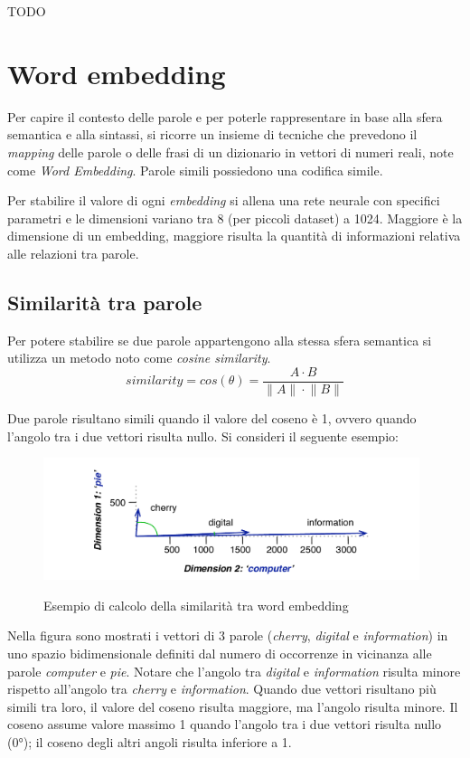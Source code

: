 TODO

\section{Word embedding}
Per capire il contesto delle parole e per poterle rappresentare in base alla sfera semantica e alla sintassi, si ricorre un insieme di tecniche che prevedono il \textit{mapping} delle parole o delle frasi di un dizionario in vettori di numeri reali, note come \emph{Word Embedding}.
Parole simili possiedono una codifica simile.


Per stabilire il valore di ogni \textit{embedding} si allena una rete neurale con specifici parametri e le dimensioni variano tra 8 (per piccoli dataset) a 1024. Maggiore è la dimensione di un embedding, maggiore risulta la quantità di informazioni relativa alle relazioni tra parole. \cite{tensword}

\subsection{Similarità tra parole}

Per potere stabilire se due parole appartengono alla stessa sfera semantica si utilizza un metodo noto come \emph{cosine similarity}.
\begin{equation}
    similarity = cos(\theta) = \frac{A\cdot{B}}{\|A\|\cdot{\|B\|}}
\end{equation}

Due parole risultano simili quando il valore del coseno è 1, ovvero quando l'angolo tra i due vettori risulta nullo. Si consideri il seguente esempio:

\begin{figure}[h]
    \centering
    \includegraphics[width=11cm]{./immagini/cosine_similarity_esempio.png}
    \label{cosine}
    \caption{Esempio di calcolo della similarità tra word embedding}
\end{figure}

Nella figura sono mostrati i vettori di 3 parole (\textit{cherry}, \textit{digital} e \textit{information}) in uno spazio bidimensionale definiti dal numero di occorrenze in vicinanza alle parole \textit{computer} e \textit{pie}.
Notare che l'angolo tra \textit{digital} e \textit{information} risulta minore rispetto all'angolo tra \textit{cherry} e \textit{information}.
Quando due vettori risultano più simili tra loro, il valore del coseno risulta maggiore, ma l'angolo risulta minore. Il coseno assume valore massimo 1 quando l'angolo tra i due vettori risulta nullo (0°); il coseno degli altri angoli risulta inferiore a 1. \cite{cosine}

